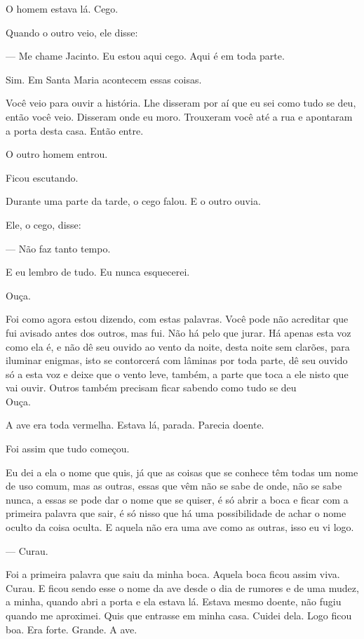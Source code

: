 \vspace*{4cm}

O homem estava lá. Cego.

Quando o outro veio, ele disse:

--- Me chame Jacinto. Eu estou aqui cego. Aqui é em toda parte.

Sim. Em Santa Maria acontecem essas coisas.

Você veio para ouvir a história. Lhe disseram por aí que eu sei como
tudo se deu, então você veio. Disseram onde eu moro. Trouxeram você até
a rua e apontaram a porta desta casa. Então entre.

O outro homem entrou.

Ficou escutando.

Durante uma parte da tarde, o cego falou. E o outro ouvia.

Ele, o cego, disse:

--- Não faz tanto tempo.

E eu lembro de tudo. Eu nunca esquecerei.

Ouça.

Foi como agora estou dizendo, com estas palavras. Você pode não
acreditar que fui avisado antes dos outros, mas fui. Não há pelo que
jurar. Há apenas esta voz como ela é, e não dê seu ouvido ao vento da
noite, desta noite sem clarões, para iluminar enigmas, isto se
contorcerá com lâminas por toda parte, dê seu ouvido só a esta voz e
deixe que o vento leve, também, a parte que toca a ele nisto que vai
ouvir. Outros também precisam ficar sabendo como tudo se deu\\

Ouça.

A ave era toda vermelha. Estava lá, parada. Parecia doente.

Foi assim que tudo começou.

Eu dei a ela o nome que quis, já que as coisas que se conhece têm todas
um nome de uso comum, mas as outras, essas que vêm não se sabe de onde,
não se sabe nunca, a essas se pode dar o nome que se quiser, é só abrir
a boca e ficar com a primeira palavra que sair, é só nisso que há uma
possibilidade de achar o nome oculto da coisa oculta. E aquela não era
uma ave como as outras, isso eu vi logo.

--- Curau.

Foi a primeira palavra que saiu da minha boca. Aquela boca ficou assim
viva. Curau. E ficou sendo esse o nome da ave desde o dia de rumores e
de uma mudez, a minha, quando abri a porta e ela estava lá. Estava mesmo
doente, não fugiu quando me aproximei. Quis que entrasse em minha casa.
Cuidei dela. Logo ficou boa. Era forte. Grande. A ave.

